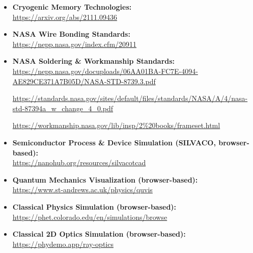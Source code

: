 \begin{itemize}
  \item\textbf{Cryogenic Memory Technologies:}\\
\url{https://arxiv.org/abs/2111.09436}

  \item\textbf{NASA Wire Bonding Standards:}\\
\url{https://nepp.nasa.gov/index.cfm/20911}

  \item\textbf{NASA Soldering \& Workmanship Standards:}\\
\url{https://nepp.nasa.gov/docuploads/06AA01BA-FC7E-4094-AE829CE371A7B05D/NASA-STD-8739.3.pdf}

\url{https://standards.nasa.gov/sites/default/files/standards/NASA/A/4/nasa-std-87394a_w_change_4_0.pdf}

\url{https://workmanship.nasa.gov/lib/insp/2%20books/frameset.html}

  \item\textbf{Semiconductor Process \& Device Simulation (SILVACO, browser-based):}\\
\url{https://nanohub.org/resources/silvacotcad}

  \item\textbf{Quantum Mechanics Visualization (browser-based):}\\
\url{https://www.st-andrews.ac.uk/physics/quvis}

  \item\textbf{Classical Physics Simulation (browser-based):}\\
\url{https://phet.colorado.edu/en/simulations/browse}

  \item\textbf{Classical 2D Optics Simulation (browser-based):}\\
\url{https://phydemo.app/ray-optics}


\end{itemize}

